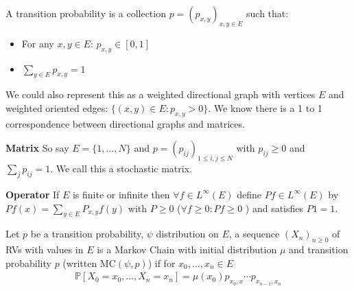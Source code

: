 \begin{defn}
	A transition probability is a collection $p=(p_{x,y})_{x,y \in E}$ such that:
	\begin{itemize}
		\item For any $x,y \in E$: $p_{x,y}\in [0,1]$ 
		\item $\sum_{y \in E} p_{x,y}=1$
	\end{itemize}
	
\end{defn}

We could also represent this as a weighted directional graph with vertices $E$ and weighted oriented edges: $\{(x,y) \in E: p_{x,y}>0\}$. We know there is a 1 to 1 correspondence between directional graphs and matrices.

\textbf{Matrix} So say $E=\{1,\ldots,N\}$ and $p=(p_{ij})_{1\leq i,j\leq N}$ with $p_{ij}\geq 0$ and $\sum_{j}p_{ij}=1$. We call this a stochastic matrix.

\textbf{Operator} If $E$ is finite or infinite then $\forall f \in L^\infty (E)$ define $Pf \in L^\infty (E)$ by  $Pf(x)=\sum_{y \in E}P_{x,y}f(y)$ with $P\geq 0 $ ($\forall  f \geq 0: Pf \geq 0$ ) and satisfies $P1=1$.

\begin{defn}
	Let $p$ be a transition probability, $\psi$ distribution on $E$, a sequence $(X_n)_{n\geq 0}$ of RVs with values in $E $ is a Markov Chain with initial distribution $\mu$ and transition probability $p$ (written $ \textrm{MC}(\psi, p)$) if for $x_0, \ldots, x_n \in E$
\begin{align}
	\boxed{ \mathbb{P} \left[ X_0=x_0, \ldots ,X_n=x_n \right] = \mu(x_0)p_{x_0,x} \cdots p_{x_{n-1},x_{n}} }
\end{align}

\end{defn}

